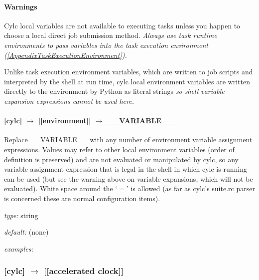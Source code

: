 \paragraph{Warnings}

\begin{myitemize}
    \item Cylc local variables are not available to
        executing tasks unless you happen to choose a local direct job
        submission method.  {\em Always use task runtime environments to
        pass variables into the task execution environment
        (\ref{AppendixTaskExecutionEnvironment}).}
    \item Unlike task execution environment variables, which are written
        to job scripts and interpreted by the shell at run time, 
        cylc local environment variables are written directly 
        to the environment by Python as literal strings {\em  so 
        shell variable expansion expressions cannot be used here.}
\end{myitemize}

\paragraph[\_\_VARIABLE\_\_ ]{[cylc] $\rightarrow$ [[environment]] $\rightarrow$ \_\_VARIABLE\_\_}

Replace \_\_VARIABLE\_\_ with any number of environment variable
assignment expressions.
Values may refer to other local environment variables (order of
definition is preserved) and are not evaluated or manipulated by 
cylc, so any variable assignment expression that is legal in the 
shell in which cylc is running can be used (but see the warning 
above on variable expansions, which will not be evaluated).
White space around the `$=$' is allowed (as far as cylc's suite.rc 
parser is concerned these are normal configuration items).

\begin{myitemize}
    \item {\em type:} string
    \item {\em default:} (none)
    \item {\em examples:} 
\end{myitemize}

\subsubsection[{[[}accelerated clock{]]}]{[cylc] $\rightarrow$ [[accelerated clock]] }
\label{ClockConfig}

